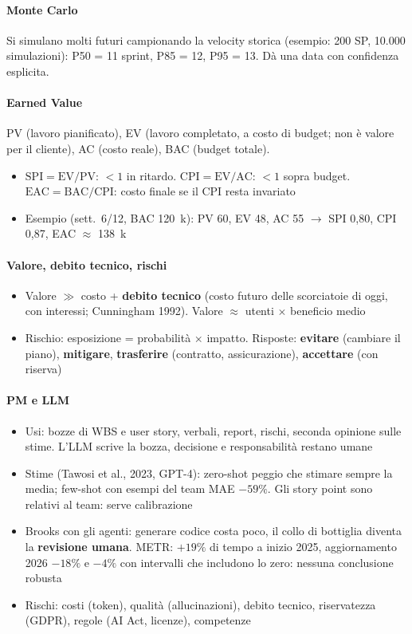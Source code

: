 \documentclass[12pt]{extarticle}
\begin{document}
\paragraph{Monte Carlo} Si simulano molti futuri campionando la velocity storica (esempio: 200 SP, 10.000 simulazioni): P50 = 11 sprint, P85 = 12, P95 = 13. Dà una data con confidenza esplicita.

\paragraph{Earned Value} PV (lavoro pianificato), EV (lavoro completato, a costo di budget; non è valore per il cliente), AC (costo reale), BAC (budget totale).
\begin{itemize}
    \item $\mathrm{SPI}=\mathrm{EV}/\mathrm{PV}$: $<1$ in ritardo. $\mathrm{CPI}=\mathrm{EV}/\mathrm{AC}$: $<1$ sopra budget. $\mathrm{EAC}=\mathrm{BAC}/\mathrm{CPI}$: costo finale se il CPI resta invariato
    \item Esempio (sett.\ 6/12, BAC 120~k\texteuro): PV 60, EV 48, AC 55 $\rightarrow$ SPI 0,80, CPI 0,87, EAC $\approx$ 138~k\texteuro
\end{itemize}

\paragraph{Valore, debito tecnico, rischi}
\begin{itemize}
    \item Valore $\gg$ costo + \textbf{debito tecnico} (costo futuro delle scorciatoie di oggi, con interessi; Cunningham 1992). Valore $\approx$ utenti $\times$ beneficio medio
    \item Rischio: esposizione = probabilità $\times$ impatto. Risposte: \textbf{evitare} (cambiare il piano), \textbf{mitigare}, \textbf{trasferire} (contratto, assicurazione), \textbf{accettare} (con riserva)
\end{itemize}

\paragraph{PM e LLM}
\begin{itemize}
    \item Usi: bozze di WBS e user story, verbali, report, rischi, seconda opinione sulle stime. L'LLM scrive la bozza, decisione e responsabilità restano umane
    \item Stime (Tawosi et al., 2023, GPT-4): zero-shot peggio che stimare sempre la media; few-shot con esempi del team MAE $-59\%$. Gli story point sono relativi al team: serve calibrazione
    \item Brooks con gli agenti: generare codice costa poco, il collo di bottiglia diventa la \textbf{revisione umana}. METR: $+19\%$ di tempo a inizio 2025, aggiornamento 2026 $-18\%$ e $-4\%$ con intervalli che includono lo zero: nessuna conclusione robusta
    \item Rischi: costi (token), qualità (allucinazioni), debito tecnico, riservatezza (GDPR), regole (AI Act, licenze), competenze
\end{itemize}
\end{document}
